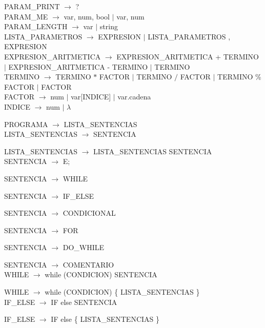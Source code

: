 \documentclass[10pt,a4paper]{article}
\begin{document}
PARAM\_PRINT $\rightarrow$ ? \\

PARAM\_ME $\rightarrow$ var, num, bool $|$ var, num \\

PARAM\_LENGTH $\rightarrow$ var $|$ string \\

LISTA\_PARAMETROS $\rightarrow$ EXPRESION $|$ LISTA\_PARAMETROS , EXPRESION \\

EXPRESION\_ARITMETICA $\rightarrow$ EXPRESION\_ARITMETICA + TERMINO $|$ EXPRESION\_ARITMETICA - TERMINO $|$ TERMINO \\

TERMINO $\rightarrow$ TERMINO $*$ FACTOR $|$ TERMINO $/$ FACTOR $|$ TERMINO \% FACTOR $|$ FACTOR \\

FACTOR $\rightarrow$ num $|$ var[INDICE] $|$ var.cadena  \\

INDICE $\rightarrow$ num $|$  $\lambda$ \\




\newpage


PROGRAMA $\rightarrow$ LISTA\_SENTENCIAS \\

LISTA\_SENTENCIAS $\rightarrow$ SENTENCIA 

LISTA\_SENTENCIAS $\rightarrow$ LISTA\_SENTENCIAS SENTENCIA \\

SENTENCIA $\rightarrow$  E; 

SENTENCIA $\rightarrow$  WHILE  

SENTENCIA $\rightarrow$  IF\_ELSE  

SENTENCIA $\rightarrow$  CONDICIONAL  

SENTENCIA $\rightarrow$  FOR 

SENTENCIA $\rightarrow$  DO\_WHILE   

SENTENCIA $\rightarrow$  COMENTARIO \\ 


WHILE $\rightarrow$ while (CONDICION) SENTENCIA  

WHILE $\rightarrow$ while (CONDICION) \{ LISTA\_SENTENCIAS \} \\

IF\_ELSE $\rightarrow$ IF else SENTENCIA  

IF\_ELSE $\rightarrow$ IF else \{ LISTA\_SENTENCIAS \} \\
\end{document}

